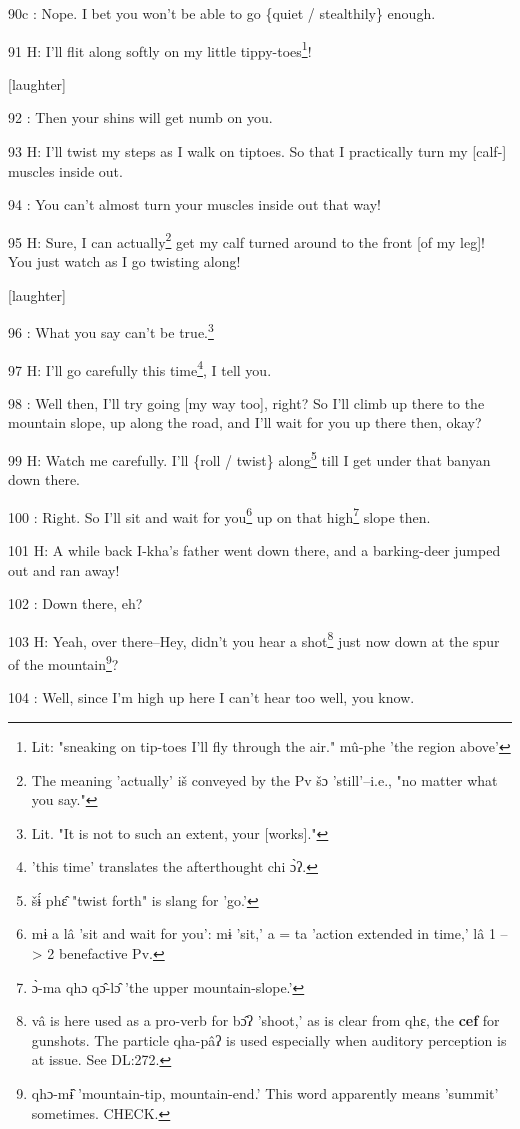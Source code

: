 90c  : Nope. I bet you won't be able to go \{quiet / stealthily\} enough.

91 H: I'll flit along softly on my little tippy-toes\footnote{Lit: "sneaking on tip-toes I'll fly through the air." mû-phe 'the region above'}!

[laughter]

92  : Then your shins will get numb on you.

93 H: I'll twist my steps as I walk on tiptoes. So that I practically turn my [calf-]
muscles inside out.

94  : You can't almost turn your muscles inside out that way!

95 H: Sure, I can actually\footnote{The meaning 'actually' iš conveyed by the Pv šɔ 'still'--i.e., "no matter what you say."} get my calf turned around to the front [of my leg]!
You just watch as I go twisting along!

[laughter]

96  : What you say can't be true.\footnote{Lit. "It is not to such an extent, your [works]."}

97 H: I'll go carefully this time\footnote{'this time' translates the afterthought chi ɔ̀ʔ.}, I tell you.

98  : Well then, I'll try going [my way too], right? So I'll climb up there to
the mountain slope, up along the road, and I'll wait for you up there then, okay?

99 H: Watch me carefully. I'll \{roll / twist\} along\footnote{šɨ́ phɛ̂ "twist forth" is slang for 'go.'} till I get under that
banyan down there.

100  : Right. So I'll sit and wait for you\footnote{mɨ a lâ 'sit and wait for you': mɨ 'sit,' a = ta 'action extended in time,' lâ 1 --> 2 benefactive Pv.} up on that high\footnote{ɔ̀-ma qhɔ qɔ̂-lɔ̂ 'the upper mountain-slope.'} slope then.

101 H: A while back I-kha's father went down there, and a barking-deer jumped out
and ran away!

102  : Down there, eh?

103 H: Yeah, over there--Hey, didn't you hear a shot\footnote{vâ is here used as a pro-verb for bɔ̂ʔ 'shoot,' as is clear from qhɛ, the \textbf{cef }for gunshots. The particle qha-pâʔ is used especially when auditory perception is at issue. See DL:272.} just now down at the spur
of the mountain\footnote{qhɔ-mɨ̂ 'mountain-tip, mountain-end.' This word apparently means 'summit' sometimes. CHECK.}?

104  : Well, since I'm high up here I can't hear too well, you know.

